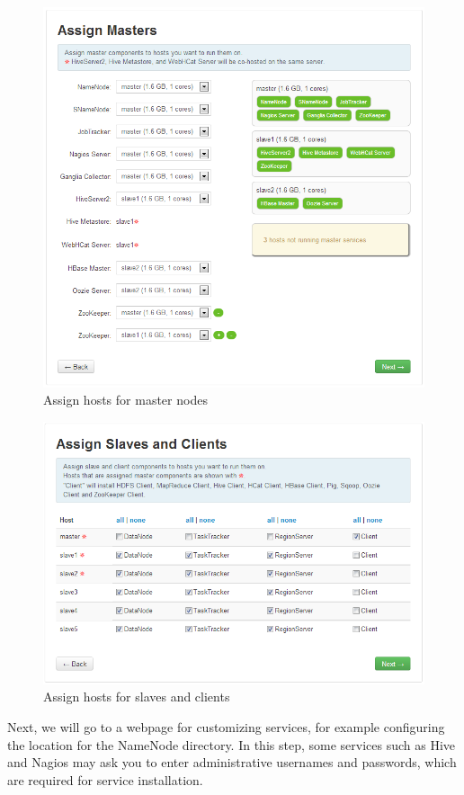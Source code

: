 \begin{figure}[ht]
  \centering
  \includegraphics[width=.8\textwidth]{figs/5163os_06_19.png}
  \caption{Assign hosts for master nodes}\label{fig:assign.masters}
\end{figure} 

\begin{figure}[ht]
  \centering
  \includegraphics[width=.8\textwidth]{figs/5163os_06_20.png}
  \caption{Assign hosts for slaves and clients}\label{fig:assign.slaves}
\end{figure} 
Next, we will go to a webpage for customizing services, for example configuring the location for the NameNode directory. In this step, some services such as Hive and Nagios may ask you to enter administrative usernames and passwords, which are required for service installation.

